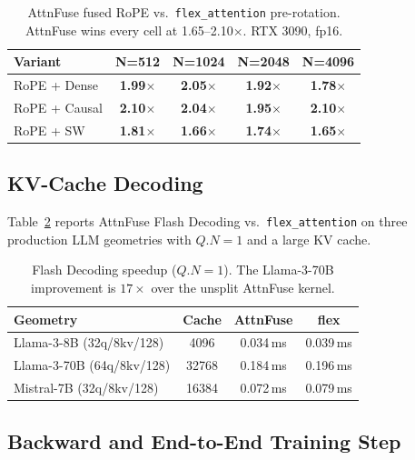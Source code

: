 \documentclass[10pt,twocolumn]{article}
\begin{document}
\begin{table}[H]
\centering\small
\begin{tabular}{lcccc}
\toprule
\textbf{Variant} & \textbf{N=512} & \textbf{N=1024} & \textbf{N=2048} & \textbf{N=4096} \\
\midrule
RoPE + Dense  & \textbf{1.99$\times$} & \textbf{2.05$\times$} & \textbf{1.92$\times$} & \textbf{1.78$\times$} \\
RoPE + Causal & \textbf{2.10$\times$} & \textbf{2.04$\times$} & \textbf{1.95$\times$} & \textbf{2.10$\times$} \\
RoPE + SW     & \textbf{1.81$\times$} & \textbf{1.66$\times$} & \textbf{1.74$\times$} & \textbf{1.65$\times$} \\
\bottomrule
\end{tabular}
\caption{AttnFuse fused RoPE vs.\ \texttt{flex\_attention}
pre-rotation. AttnFuse wins every cell at 1.65--2.10$\times$. RTX
3090, fp16.}
\label{tab:rope_comp}
\end{table}

\subsection{KV-Cache Decoding}
\label{sec:eval_decode}

Table~\ref{tab:decode} reports AttnFuse Flash Decoding vs.\
\texttt{flex\_attention} on three production LLM geometries with
$Q.N{=}1$ and a large KV cache.

\begin{table}[H]
\centering\small
\begin{tabular}{lccc}
\toprule
\textbf{Geometry} & \textbf{Cache} & \textbf{AttnFuse} & \textbf{flex} \\
\midrule
Llama-3-8B  (32q/8kv/128)  & 4096  & 0.034\,ms & 0.039\,ms \\
Llama-3-70B (64q/8kv/128)  & 32768 & 0.184\,ms & 0.196\,ms \\
Mistral-7B  (32q/8kv/128)  & 16384 & 0.072\,ms & 0.079\,ms \\
\bottomrule
\end{tabular}
\caption{Flash Decoding speedup ($Q.N{=}1$). The Llama-3-70B
improvement is $17\times$ over the unsplit AttnFuse kernel.}
\label{tab:decode}
\end{table}

\subsection{Backward and End-to-End Training Step}
\end{document}
